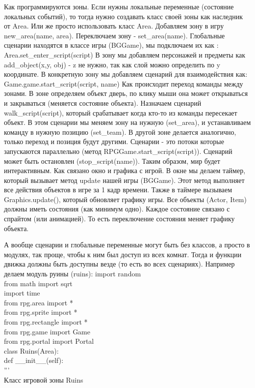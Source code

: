 Как программируются зоны. Если нужны локальные переменные (состояние локальных событий), то тогда нужно создавать класс своей зоны как наследник от Area. Или же просто использовать класс Area. Добавляем зону в игру new\_area(name, area). Переключаем зону - set\_area(name). Глобальные сценарии находятся в классе игры (BGGame), мы подключаем их как :
Area.set\_enter\_script(script)
В зону мы добавляем персонажей и предметы как add\_object(x,y, obj) - z не нужно, так как слой можно определить по y координате.
В конкретную зону мы добавляем сценарий для взаимодействия как: Game.game.start\_script(script, name)
Как происходит переход команды между зонами.
В зоне определяем объект дверь, по клику мыши она может открываться и закрываться (меняется состояние объекта). Назначаем сценарий walk\_script(script), который срабатывает когда кто-то из команды пересекает объект. В этом сценарии мы меняем зону на нужную (set\_area), и устанавливаем команду в нужную позицию (set\_team). В другой зоне делается аналогично, только переход и позиция будут другими.
Сценарии - это потоки которые запускаются параллельно (метод RPGGame.start\_script(script)). Сценарий может быть остановлен (stop\_script(name)).
Таким образом, мир будет интерактивным.
Как связано окно и графика с игрой. В окне мы делаем таймер, который вызывает метод update нашей игры (BGGame). Этот метод выполняет все действия объектов в игре за 1 кадр времени.
Также в таймере вызываем Graphics.update(), который обновляет графику игры.
Все объекты (Actor, Item) должны иметь состояния (как минимум одно). Каждое состояние связано с спрайтом (или анимацией). То есть переключение состояния меняет графику объекта.

А вообще сценарии и глобальные переменные могут быть без классов, а просто в модулях, так проще, чтобы к ним был доступ из всех комнат. Тогда и функции движка должны быть доступны везде (то есть во всех сценариях). Например делаем модуль руины (ruins):
import random\\
from math import sqrt\\
import time\\
from rpg.area import *\\
from rpg.sprite import *\\
from rpg.rectangle import *\\
from rpg.game import Game\\
from rpg.portal import Portal\\

class Ruins(Area):\\
def \_\_init\_\_(self):\\
'''\\
Класс игровой зоны Ruins\\

